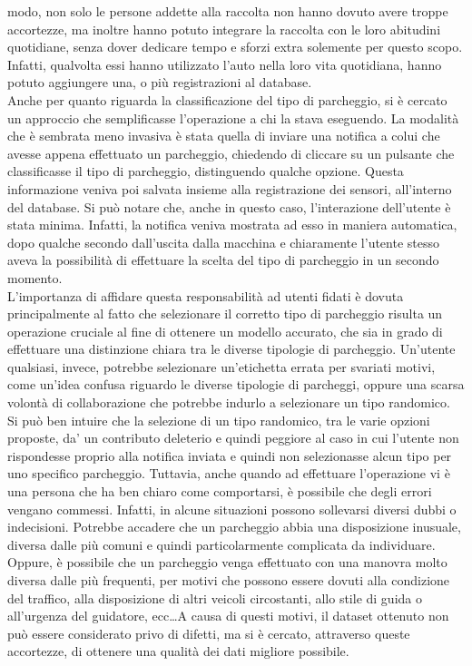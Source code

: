 modo, non solo le persone addette alla raccolta non hanno dovuto avere troppe accortezze, ma
inoltre hanno potuto integrare la raccolta con le loro abitudini quotidiane, senza dover
dedicare tempo e sforzi extra solemente per questo scopo. Infatti, qualvolta essi hanno
utilizzato l'auto nella loro vita quotidiana, hanno potuto aggiungere una, o più registrazioni
al database. \\
Anche per quanto riguarda la classificazione del tipo di parcheggio, si è cercato un approccio
che semplificasse l'operazione a chi la stava eseguendo. La modalità che è sembrata meno 
invasiva è stata quella di inviare una notifica a colui che avesse appena effettuato un
parcheggio, chiedendo di cliccare su un pulsante che classificasse il tipo di parcheggio, 
distinguendo qualche opzione. Questa informazione veniva poi salvata insieme alla registrazione
dei sensori, all'interno del database. Si può notare che, anche in questo caso, l'interazione
dell'utente è stata minima. Infatti, la notifica veniva mostrata ad esso in maniera automatica,
dopo qualche secondo dall'uscita dalla macchina e chiaramente l'utente stesso aveva la possibilità
di effettuare la scelta del tipo di parcheggio in un secondo momento.\\
L'importanza di affidare questa responsabilità ad utenti fidati è dovuta principalmente al fatto
che selezionare il corretto tipo di parcheggio risulta un operazione cruciale al fine di ottenere
un modello accurato, che sia in grado di effettuare una distinzione chiara tra le diverse tipologie
di parcheggio. Un'utente qualsiasi, invece, potrebbe selezionare un'etichetta errata per svariati
motivi, come un'idea confusa riguardo le diverse tipologie di parcheggi, oppure una scarsa volontà
di collaborazione che potrebbe indurlo a selezionare un tipo randomico. Si può ben intuire che la
selezione di un tipo randomico, tra le varie opzioni proposte, da' un contributo deleterio e quindi
peggiore al caso in cui l'utente non rispondesse proprio alla notifica inviata e quindi non selezionasse
alcun tipo per uno specifico parcheggio. Tuttavia, anche quando ad effettuare l'operazione vi è una
persona che ha ben chiaro come comportarsi, è possibile che degli errori vengano commessi. Infatti,
in alcune situazioni possono sollevarsi diversi dubbi o indecisioni. Potrebbe accadere che un parcheggio
abbia una disposizione inusuale, diversa dalle più comuni e quindi particolarmente complicata da
individuare. Oppure, è possibile che un parcheggio venga effettuato con una manovra molto diversa dalle
più frequenti, per motivi che possono essere dovuti alla condizione del traffico, alla disposizione di
altri veicoli circostanti, allo stile di guida o all'urgenza del guidatore, ecc\dots A causa di questi
motivi, il dataset ottenuto non può essere considerato privo di difetti, ma si è cercato, attraverso
queste accortezze, di ottenere una qualità dei dati migliore possibile.

